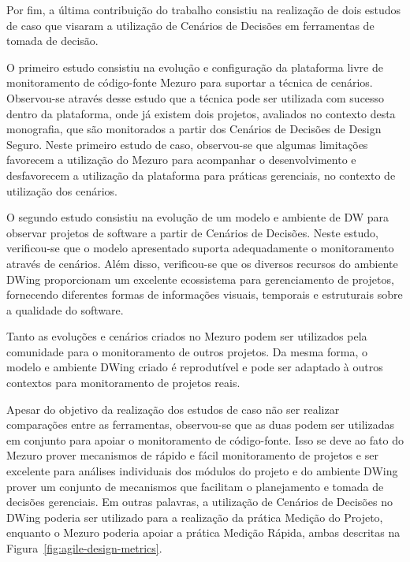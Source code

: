 %

Por fim, a última contribuição do trabalho consistiu na realização de dois estudos de caso que visaram a utilização de Cenários de Decisões em ferramentas de tomada de decisão. 

O primeiro estudo consistiu na evolução e configuração da plataforma livre de monitoramento de código-fonte Mezuro para suportar a técnica de cenários. Observou-se através desse estudo que a técnica pode ser utilizada com sucesso dentro da plataforma, onde já existem dois projetos, avaliados no contexto desta monografia, que são monitorados a partir dos Cenários de Decisões de Design Seguro. Neste primeiro estudo de caso, observou-se que algumas limitações favorecem a utilização do Mezuro para acompanhar o desenvolvimento e desfavorecem a utilização da plataforma para práticas gerenciais, no contexto de utilização dos cenários.

O segundo estudo consistiu na evolução de um modelo e ambiente de DW para observar projetos de software a partir de Cenários de Decisões. Neste estudo, verificou-se que o modelo apresentado suporta adequadamente o monitoramento através de cenários. Além disso, verificou-se que os diversos recursos do ambiente DWing proporcionam um excelente ecossistema para gerenciamento de projetos, fornecendo diferentes formas de informações visuais, temporais e estruturais sobre a qualidade do software. 

Tanto as evoluções e cenários criados no Mezuro podem ser utilizados pela comunidade para o monitoramento de outros projetos. Da mesma forma, o modelo e ambiente DWing criado é reprodutível e pode ser adaptado à outros contextos para monitoramento de projetos reais.

Apesar do objetivo da realização dos estudos de caso não ser realizar comparações entre as ferramentas, observou-se que as duas podem ser utilizadas em conjunto para apoiar o monitoramento de código-fonte. Isso se deve ao fato do Mezuro prover mecanismos de rápido e fácil monitoramento de projetos e ser excelente para análises individuais dos módulos do projeto e do ambiente DWing prover um conjunto de mecanismos que facilitam o planejamento e tomada de decisões gerenciais. Em outras palavras, a utilização de Cenários de Decisões no DWing poderia ser utilizado para a realização da prática Medição do Projeto, enquanto o Mezuro poderia apoiar a prática Medição Rápida, ambas descritas na Figura~\ref{fig:agile-design-metrics}.



